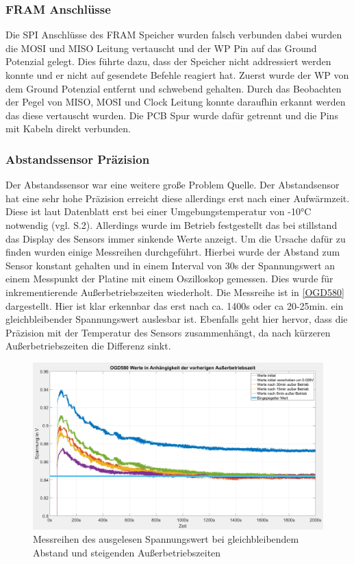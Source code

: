 \subsubsection{FRAM Anschlüsse}
Die SPI Anschlüsse des FRAM Speicher wurden falsch verbunden dabei wurden die \ac{MOSI} und \ac{MISO} Leitung vertauscht und der \ac{WP} Pin auf das Ground Potenzial gelegt. Dies führte dazu, dass der Speicher nicht addressiert werden konnte und er nicht auf gesendete Befehle reagiert hat. Zuerst wurde der \ac{WP} von dem Ground Potenzial entfernt und schwebend gehalten. Durch das Beobachten der Pegel von MISO, MOSI und Clock Leitung konnte daraufhin erkannt werden das diese vertauscht wurden. Die PCB Spur wurde dafür getrennt und die Pins mit Kabeln direkt verbunden.
\subsubsection{Abstandssensor Präzision}
Der Abstandssensor war eine weitere große Problem Quelle. Der Abstandsensor hat eine sehr hohe Präzision erreicht diese allerdings erst nach einer Aufwärmzeit. Diese ist laut Datenblatt erst bei einer Umgebungstemperatur von -10°C notwendig (vgl. \cite{OGD580_Datasheet} S.2). Allerdings wurde im Betrieb festgestellt das bei stillstand das Display des Sensors immer sinkende Werte anzeigt. Um die Ursache dafür zu finden wurden einige Messreihen durchgeführt. Hierbei wurde der Abstand zum Sensor konstant gehalten und in einem Interval von 30s der Spannungswert an einem Messpunkt der Platine mit einem Oszilloskop gemessen. Dies wurde für inkrementierende Außerbetriebszeiten wiederholt. Die Messreihe ist in \autoref{OGD580} dargestellt. Hier ist klar erkennbar das erst nach ca. 1400s oder ca 20-25min. ein gleichbleibender Spannungswert auslesbar ist. Ebenfalls geht hier hervor, dass die Präzision mit der Temperatur des Sensors zusammenhängt, da nach kürzeren Außerbetriebszeiten die Differenz sinkt.
\begin{figure}[H]
	\centering
	\includegraphics[width=1.0\textwidth]{images/Hardware/Abstandssensor_plot_highres.PNG}
	\caption{Messreihen des ausgelesen Spannungswert bei gleichbleibendem Abstand und steigenden Außerbetriebszeiten}
	\label{fig:Messreihe_Temperatur}
\end{figure}

